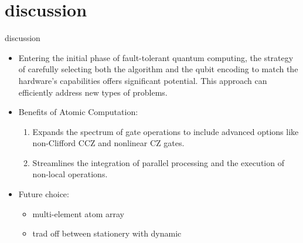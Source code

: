 \documentclass[18 pt]{beamer}
\begin{document}
\section{discussion}
\begin{frame}{discussion}
  \begin{itemize}[itemsep=10pt]
    \item Entering the initial phase of fault-tolerant quantum computing, the strategy of carefully selecting both the algorithm and the qubit encoding to match the hardware's capabilities offers significant potential. This approach can efficiently address new types of problems.
    \item Benefits of Atomic Computation:
        \begin{enumerate}[itemsep=5pt]
          \item Expands the spectrum of gate operations to include advanced options like non-Clifford CCZ and nonlinear CZ gates.
          \item Streamlines the integration of parallel processing and the execution of non-local operations.
        \end{enumerate}  
    \item Future choice:
        \begin{itemize}
          \item multi-element atom array
          \item trad off between stationery with dynamic
        \end{itemize}
  \end{itemize}
  
\end{frame}
\end{document}
